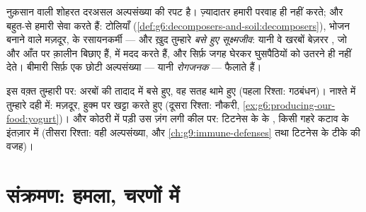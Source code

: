 \begin{proposition}[ज़्यादातर बेज़रर, और अक्सर ज़रूरी]\label{prop:g9:microbes-and-infection:mostly}
नुक़सान वाली शोहरत दरअसल अल्पसंख्या की रपट है। ज़्यादातर 
हमारी परवाह ही नहीं करते; और बहुत-से हमारी सेवा करते हैं:  टोलियाँ
(\cref{def:g6:decomposers-and-soil:decomposers}), भोजन बनाने वाले
मज़दूर,  के रसायनकर्मी --- और ख़ुद तुम्हारे \emph{बसे हुए
सूक्ष्मजीव}: यानी वे खरबों बेज़रर , जो
 और आँत पर क़ालीन बिछाए हैं,  में मदद करते हैं, और सिर्फ़ जगह
घेरकर घुसपैठियों को उतरने ही नहीं देते। बीमारी सिर्फ़ एक छोटी
अल्पसंख्या --- यानी \emph{रोगजनक} --- फैलाते हैं।
\end{proposition}
\admitted

\begin{example}[एक शरीर, तीन रिश्ते]\label{ex:g9:microbes-and-infection:relations}
इस वक़्त तुम्हारी  पर: अरबों की तादाद में बसे हुए, वह सतह थामे हुए
(पहला रिश्ता: गठबंधन)। नाश्ते में तुम्हारे दही में: मज़दूर, हुक्म पर
खट्टा करते हुए (दूसरा रिश्ता: नौकरी,
\cref{ex:g6:producing-our-food:yogurt})। और कोठरी में पड़ी उस ज़ंग लगी
कील पर: टिटनेस के  के , किसी गहरे कटाव के इंतज़ार में (तीसरा
रिश्ता: वही  अल्पसंख्या, और \cref{ch:g9:immune-defenses} तथा
टिटनेस के टीके की वजह)।
\end{example}

\section{संक्रमण: हमला, चरणों में}

